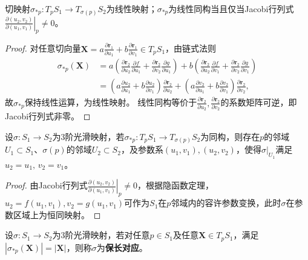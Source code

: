 \documentclass[../../main.tex]{subfiles}%
\begin{document}
\begin{proposition}
切映射$\sigma_{*p}:T_pS_1\to T_{\sigma(p)}S_2$为线性映射；$\sigma_{*p}$为线性同构当且仅当Jacobi行列式$\left.\frac{\partial(u_2,v_2)}{\partial(u_1,v_1)}\right|_p\neq0$。
\end{proposition}
\begin{proof}

对任意切向量$\boldsymbol{X}=a\frac{\partial\boldsymbol{r}_1}{\partial u_1}+b\frac{\partial\boldsymbol{r}_1}{\partial v_1}\in T_pS_1$，由链式法则
\begin{align*}
\sigma_{*p}(\boldsymbol{X})&=a\left(\frac{\partial\boldsymbol{r}_2}{\partial u_2}\frac{\partial f}{\partial u_1}+\frac{\partial\boldsymbol{r}_2}{\partial v_2}\frac{\partial g}{\partial u_1}\right)+b\left(\frac{\partial\boldsymbol{r}_2}{\partial u_2}\frac{\partial f}{\partial v_1}+\frac{\partial\boldsymbol{r}_2}{\partial v_2}\frac{\partial g}{\partial v_1}\right)\\
&=\left(a\frac{\partial u_2}{\partial u_1}+b\frac{\partial u_2}{\partial v_1}\right)\frac{\partial\boldsymbol{r}_2}{\partial u_2}+\left(a\frac{\partial v_2}{\partial u_1}+b\frac{\partial v_2}{\partial v_1}\right)\frac{\partial\boldsymbol{r}_2}{\partial v_2},
\end{align*}
故$\sigma_{*p}$保持线性运算，为线性映射。
线性同构等价于$\frac{\partial\boldsymbol{r}_2}{\partial u_2},\frac{\partial\boldsymbol{r}_2}{\partial v_2}$的系数矩阵可逆，即Jacobi行列式非零。

\end{proof}

\begin{theorem}
设$\sigma:S_1\to S_2$为3阶光滑映射，若$\sigma_{*p}:T_pS_1\to T_{\sigma(p)}S_2$为同构，则存在$p$的邻域$U_1\subset S_1$、$\sigma(p)$的邻域$U_2\subset S_2$，及参数系$(u_1,v_1),(u_2,v_2)$，使得$\sigma|_{U_1}$满足$u_2=u_1,\,v_2=v_1$。
\end{theorem}
\begin{proof}

由Jacobi行列式$\left.\frac{\partial(u_2,v_2)}{\partial(u_1,v_1)}\right|_p\neq0$，根据隐函数定理，$u_2=f(u_1,v_1),v_2=g(u_1,v_1)$可作为$S_1$在$p$邻域内的容许参数变换，此时$\sigma$在参数区域上为恒同映射。

\end{proof}

\begin{definition}
设$\sigma:S_1\to S_2$为3阶光滑映射，若对任意$p\in S_1$及任意$\boldsymbol{X}\in T_pS_1$，满足$|\sigma_{*p}(\boldsymbol{X})|=|\boldsymbol{X}|$，则称$\sigma$为\textbf{保长对应}。
\end{definition}
\end{document}
